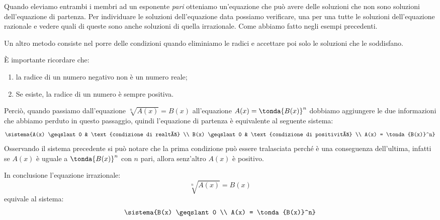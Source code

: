 
Quando eleviamo entrambi i membri ad un esponente \emph{pari} otteniamo 
un'equazione che può avere delle soluzioni che non sono soluzioni 
dell'equazione di partenza. Per individuare le soluzioni dell'equazione data 
possiamo verificare, una per una tutte le soluzioni dell'equazione razionale e 
vedere quali di queste sono anche soluzioni di quella irrazionale. Come abbiamo 
fatto negli esempi precedenti.

Un altro metodo consiste nel porre delle condizioni quando eliminiamo le radici 
e accettare poi solo le soluzioni che le soddisfano.

È importante ricordare che:
\begin{enumerate}
 \item la radice di un numero negativo non è un numero reale;
 \item Se esiste, la radice di un numero è sempre positiva.
\end{enumerate}

Perciò, quando passiamo dall'equazione \(\sqrt[n]{A(x)} = B(x)\) 
all'equazione \(A(x) = \tonda{B(x)}^n\)  dobbiamo aggiungere le due 
informazioni che abbiamo perduto in questo passaggio, quindi l'equazione di 
partenza è equivalente al seguente sistema:
\[\sistema{A(x) \geqslant 0 & \text{condizione di realtà} \\
           B(x) \geqslant 0 & \text{condizione di positività} \\
           A(x) = \tonda{B(x)}^n}
\]
Osservando il sistema precedente si può notare che la 
prima condizione può essere tralasciata perché è una conseguenza 
dell'ultima, infatti se \(A(x)\) è uguale a 
\(\tonda{B(x)}^n\) con \(n\) pari, allora senz'altro \(A(x)\) è positivo.

In conclusione l'equazione irrazionale: 
\[\sqrt[n]{A(x)} = B(x)\]
equivale al sistema:
\[\sistema{B(x) \geqslant 0 \\
           A(x) = \tonda{B(x)}^n}
\]

